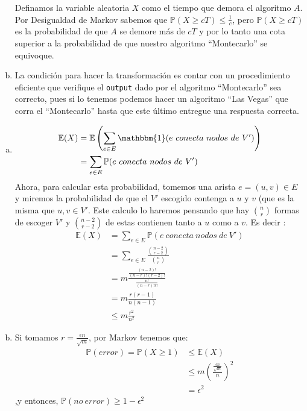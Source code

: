 \documentclass[dcc,uchile]{fcfmcourse}
\begin{document}
\begin{problems}
\begin{enumerate}[a)]
\begin{itemize}
\end{itemize}
Definamos la variable aleatoria $X$ como el tiempo que demora el algoritmo $A$. Por Desigualdad de Markov sabemos que $\mathbb{P}(X\ge cT) \le \frac{1}{c}$, pero $\mathbb{P}(X\ge cT)$ es la probabilidad de que $A$ se demore más de $cT$ y por lo tanto una cota superior a la probabilidad de que nuestro algoritmo ``Montecarlo'' se equivoque.
\item La condición para hacer la transformación es contar con un procedimiento eficiente que verifique el \texttt{output} dado por el algoritmo ``Montecarlo'' sea correcto, pues si lo tenemos podemos hacer un algoritmo ``Las Vegas'' que corra el ``Montecarlo'' hasta que este último entregue una respuesta correcta.
\end{enumerate}
\problem
\begin{enumerate}[a)]
\item 
\begin{align*}
\mathbb{E}(X) &= \mathbb{E}\left(\sum_{e \in E}\mathbbm{1}(e\ conecta\ nodos\ de\ V')\right)\\
&= \sum_{e \in E} \mathbb{P}(e\ conecta\ nodos\ de\ V')
\end{align*}
Ahora, para calcular esta probabilidad, tomemos una arista $e = (u,v)\in E$ y miremos la probabilidad de que el $V'$ escogido contenga a $u$ y $v$ (que es la misma que $u,v \in V'$. Este calculo lo haremos pensando que hay $\binom{n}{r}$ formas de escoger $V'$ y $\binom{n-2}{r-2}$ de estas contienen tanto a $u$ como a $v$. Es decir :
\begin{align*}
    \mathbb{E}(X) &= \sum_{e \in E} \mathbb{P}(e\ conecta\ nodos\ de\ V')\\
    &= \sum_{e \in E} \frac{\binom{n-2}{r-2}}{\binom{n}{r}}\\
    &= m \frac{\frac{(n-2)!}{(n-r)!(r-2)!}}{\frac{n!}{(n-r)!r!}}\\
    &= m \frac{r(r-1)}{n(n-1)}\\
    &\le m \frac{r^2}{n^2}
\end{align*}
\item Si tomamos $r = \frac{\epsilon n }{\sqrt{m}}$, por Markov tenemos que:
\begin{align*}
    \mathbb{P}(error) = \mathbb{P}(X\ge 1) &\le \mathbb{E}(X)\\
    &\le m \left(\frac{\frac{\epsilon n }{\sqrt{m}}}{n}\right)^2\\
    &= \epsilon^2
\end{align*}
,y entonces, $\mathbb{P}(no\ error) \ge 1 - \epsilon^2$
\end{enumerate}
\end{problems}
\end{document}
